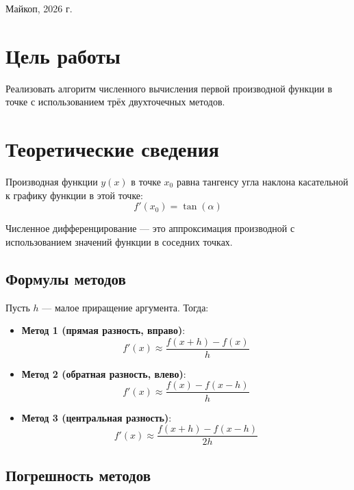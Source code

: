 \documentclass[12pt,a4paper]{article}
\begin{document}
\vspace{1.5cm}

\begin{center}
    {\normalsize Майкоп, 2026 г.}
\end{center}

\newpage

\pagestyle{plain}
\setcounter{page}{2}

\section{Цель работы}

Реализовать алгоритм численного вычисления первой производной функции в точке с использованием трёх двухточечных методов.

\section{Теоретические сведения}

Производная функции $y(x)$ в точке $x_0$ равна тангенсу угла наклона касательной к графику функции в этой точке:
\[
f'(x_0) = \tan(\alpha)
\]

Численное дифференцирование — это аппроксимация производной с использованием значений функции в соседних точках.

\subsection{Формулы методов}

Пусть $h$ — малое приращение аргумента. Тогда:

\begin{itemize}
    \item \textbf{Метод 1 (прямая разность, вправо)}:
    \[
    f'(x) \approx \frac{f(x+h) - f(x)}{h}
    \]
    
    \item \textbf{Метод 2 (обратная разность, влево)}:
    \[
    f'(x) \approx \frac{f(x) - f(x-h)}{h}
    \]
    
    \item \textbf{Метод 3 (центральная разность)}:
    \[
    f'(x) \approx \frac{f(x+h) - f(x-h)}{2h}
    \]
\end{itemize}

\subsection{Погрешность методов}
\end{document}
